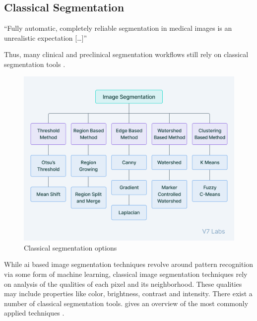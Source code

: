 \subsection{Classical Segmentation}\label{s:b-seg-techniques}
\begin{displayquote}
	``Fully automatic, completely reliable segmentation in medical images is an unrealistic expectation [\ldots]''
\end{displayquote}
Thus, many clinical and preclinical segmentation workflows still rely on classical segmentation tools \cite{yuTechniquesChallengesImage2023}.
\begin{figure}[h]
	\centerline{
		\includegraphics[scale=0.5]{images/classicalSegTree.png}}
	\caption{Classical segmentation options \cite{v7labsIntroductionImageSegmentation2021}}\label{fig:classicalSegTree}
\end{figure}
\noindent
While \acrshort{ai} based image segmentation techniques revolve around pattern recognition
via some form of machine learning,
classical image segmentation techniques rely on analysis of the qualities of each pixel and its neighborhood.
These qualities may include properties like color, brightness, contrast and intensity.
There exist a number of classical segmentation tools.
 gives an overview of the most commonly applied techniques
\cite{yuTechniquesChallengesImage2023,baliReviewStrategiesTechniques2015}.

